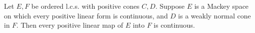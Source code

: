 Let $E, F$ be ordered l.c.s. with positive cones $C, D$. Suppose $E$ is a Mackey space on which every positive linear form is continuous, and $D$ is a weakly normal cone in $F$. Then every positive linear map of $E$ into $F$ is continuous.
